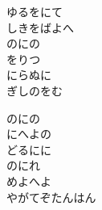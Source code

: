 \documentclass[10pt,b5j]{tarticle} %
\begin{document}
\begin{enumerate}
\begin{minipage}[c]{\blocksize}
        \vspace{\linespace}
        \item
        ゆるをにて\\
        しきをばよへ\\
        のにの\\
        をりつ\\
        にらぬに\\
        ぎしのをむ
        
        \vspace{\linespace}
        \item
        のにの\\
        にへよの\\
        どるにに\\
        のにれ\\
        めよへよ\\
        やがてぞたんはん
    
    \end{minipage}
\end{enumerate} %
\end{document}
